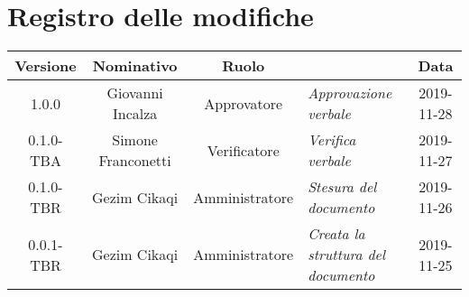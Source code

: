\section*{Registro delle modifiche}
\renewcommand{\arraystretch}{1.8}
  
  \begin{longtable}{|c|c|c|p{3.8cm}|c|}
    \hline
    
    \rowcolor{header}
    \textbf{Versione} & \textbf{Nominativo} & \textbf{Ruolo} & \centering{\textbf{Descrizione}} & \textbf{Data}\\
    
    \hline
    
    1.0.0 & Giovanni Incalza & Approvatore & \small{\textit{Approvazione verbale}} & 2019-11-28\\
    0.1.0-TBA & Simone Franconetti & Verificatore & \small{\textit{Verifica verbale}} & 2019-11-27\\
    0.1.0-TBR & Gezim Cikaqi & Amministratore & \small{\textit{Stesura del documento}} & 2019-11-26\\
    0.0.1-TBR & Gezim Cikaqi & Amministratore & \small{\textit{Creata la struttura del documento}} & 2019-11-25\\
    
    \hline
  \end{longtable}